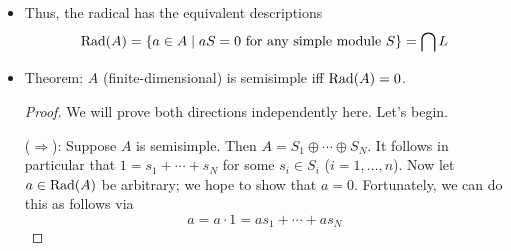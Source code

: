 \documentclass[../notes.tex]{subfiles}
\begin{document}
\begin{itemize}
\begin{proof}
        Now, to show the other inclusion, let $x\in\bigcap L$. Let $S$ be an arbitrary simple module over $A$. We know that $S\cong A/L$ for some maximal ideal $L$. To demonstrate that $xS=0$, it will suffice to confirm that $xv_0=0$ for all $v_0\in S$. Let $0\neq v_0\in S$ be arbitrary. Define $f:A\to S$ by $a\mapsto av_0$. Since $v_0$ is nonzero and hence $\im(f)$ is nontrivial, the fact that $S$ is simple must mean that $\im(f)=S$ and hence $f$ is surjective. Thus, $A/\ker(f)\cong S$. Consequently, $\ker(f)=L$. It follows since $x\in\bigcap L$ and hence $x\in L$ that $x\in\ker(f)$. But then $xv_0=0$, as desired.
    \end{proof}
    \item Thus, the radical has the equivalent descriptions
    \begin{equation*}
        \operatorname{Rad}(A) = \{a\in A\mid aS=0\text{ for any simple module }S\}
        = \bigcap L
    \end{equation*}
    \item Theorem: $A$ (finite-dimensional) is semisimple iff $\operatorname{Rad}(A)=0$.
    \begin{proof}
        We will prove both directions independently here. Let's begin.\par
        ($\Rightarrow$): Suppose $A$ is semisimple. Then $A=S_1\oplus\cdots\oplus S_N$. It follows in particular that $1=s_1+\cdots+s_N$ for some $s_i\in S_i$ ($i=1,\dots,n$). Now let $a\in\operatorname{Rad}(A)$ be arbitrary; we hope to show that $a=0$. Fortunately, we can do this as follows via
        \begin{equation*}
            a = a\cdot 1
            = as_1+\cdots+as_N

\end{equation*}
\end{proof}
\end{itemize}
\end{document}
